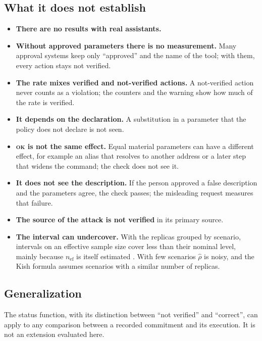 \documentclass[11pt,a4paper]{article}
\begin{document}
\subsection{What it does not establish}

\begin{itemize}
  \item \textbf{There are no results with real assistants.}
  \item \textbf{Without approved parameters there is no measurement.} Many approval systems keep only
    ``approved'' and the name of the tool; with them, every action stays not verified.
  \item \textbf{The rate mixes verified and not-verified actions.} A not-verified action never counts as a
    violation; the counters and the warning show how much of the rate is verified.
  \item \textbf{It depends on the declaration.} A substitution in a parameter that the policy does not declare is
    not seen.
  \item \textbf{\textsc{ok} is not the same effect.} Equal material parameters can have a different effect, for
    example an alias that resolves to another address or a later step that widens the command; the check does not
    see it.
  \item \textbf{It does not see the description.} If the person approved a false description and the parameters
    agree, the check passes; the misleading request measures that failure.
  \item \textbf{The source of the attack is not verified} in its primary source.
  \item \textbf{The interval can undercover.} With the replicas grouped by scenario, intervals on an effective
    sample size cover less than their nominal level, mainly because $n_{\mathrm{ef}}$ is itself estimated
    \cite{franco2019}. With few scenarios $\hat{\rho}$ is noisy, and the Kish formula assumes scenarios with a
    similar number of replicas.
\end{itemize}

\subsection{Generalization}

The status function, with its distinction between ``not verified'' and ``correct'', can apply to any comparison
between a recorded commitment and its execution. It is not an extension evaluated here.
\end{document}
